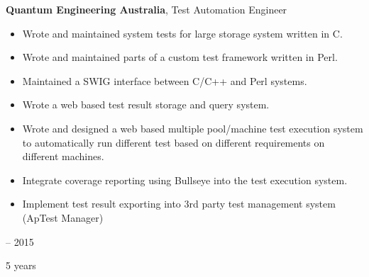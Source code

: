 \documentclass[12pt, a4paper]{article}
\newenvironment{highlights}{
    \begin{itemize}[
        topsep=0.10 cm,
        parsep=0.10 cm,
        partopsep=0pt,
        itemsep=0pt,
        leftmargin=0.4 cm + 10pt
    ]
}{
    \end{itemize}
} %
\newenvironment{twocolentry}[2][]{
    \onecolentry
    \def\secondColumn{#2}
    \setcolumnwidth{\fill, 4.5 cm}
    \begin{paracol}{2}
}{
    \switchcolumn \raggedleft \secondColumn
    \end{paracol}
    \endonecolentry
} %
\begin{document}
        \begin{twocolentry}{
            2010 – 2015

        5 years
        }
            \textbf{Quantum Engineering Australia}, Test Automation Engineer
            \begin{highlights}
                \item Wrote and maintained system tests for large storage system written in C.
                \item Wrote and maintained parts of a custom test framework written in Perl.
                \item Maintained a SWIG interface between C/C++ and Perl systems.
                \item Wrote a web based test result storage and query system.
                \item Wrote and designed a web based multiple pool/machine test execution system to automatically run different test based on different requirements on different machines.
                \item Integrate coverage reporting using Bullseye into the test execution system.
                \item Implement test result exporting into 3rd party test management system (ApTest Manager)
            \end{highlights}
        \end{twocolentry}


        \vspace{0.2 cm}
\end{document}
